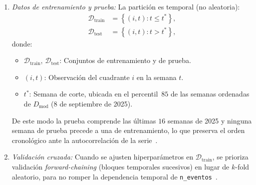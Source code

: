\begin{enumerate}
    \item \textit{Datos de entrenamiento y prueba:}
    La partición es temporal (no aleatoria):
    \begin{equation}
        \begin{aligned}
        \mathcal{D}_{\mathrm{train}} &= \left\{ (i, t) : t \leq t^{\ast} \right\}, \\
        \mathcal{D}_{\mathrm{test}} &= \left\{ (i, t) : t > t^{\ast} \right\},
        \end{aligned}
        \label{eq:particion_temporal}
    \end{equation}
    donde:
    \begin{itemize}
        \item $\mathcal{D}_{\mathrm{train}}$, $\mathcal{D}_{\mathrm{test}}$: Conjuntos de entrenamiento y de prueba.
        \item $(i, t)$: Observación del cuadrante $i$ en la semana $t$.
        \item $t^{\ast}$: Semana de corte, ubicada en el percentil~$85$ de las semanas ordenadas de $D_{\mathrm{mod}}$ (8 de septiembre de 2025).
    \end{itemize}
    De este modo la prueba comprende las últimas $16$ semanas de 2025 y ninguna semana de prueba precede a una de entrenamiento, lo que preserva el orden cronológico ante la autocorrelación de la serie~\cite{ref55,ref57}.

    \item \textit{Validación cruzada:}
    Cuando se ajusten hiperparámetros en $\mathcal{D}_{\mathrm{train}}$, se prioriza validación \emph{forward-chaining} (bloques temporales sucesivos) en lugar de $k$-fold aleatorio, para no romper la dependencia temporal de \texttt{n\_eventos}~\cite{ref56}.


\end{enumerate}
